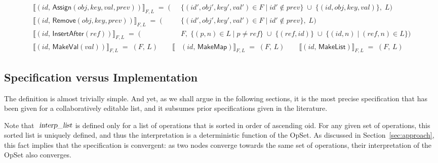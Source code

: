\begin{align*}
    \big\llbracket (\mathit{id},\, \mathsf{Assign}(\mathit{obj}, \mathit{key}, \mathit{val}, \mathit{prev})) \big\rrbracket_{F,L} \;=\; \Big( &
    \big\{ (\mathit{id}', \mathit{obj}', \mathit{key}', \mathit{val}') \in F \mid
    \mathit{id}' \notin \mathit{prev} \big\} \;\cup\;
    \big\{ (\mathit{id}, \mathit{obj}, \mathit{key}, \mathit{val}) \big\},\; L \Big) \\[5pt]
    \big\llbracket (\mathit{id},\, \mathsf{Remove}(\mathit{obj}, \mathit{key}, \mathit{prev})) \big\rrbracket_{F,L} \;=\; \Big( &
    \big\{ (\mathit{id}', \mathit{obj}', \mathit{key}', \mathit{val}') \in F \mid
    \mathit{id}' \notin \mathit{prev} \big\},\; L \Big) \\[5pt]
    \big\llbracket (\mathit{id},\, \mathsf{InsertAfter}(\mathit{ref})) \big\rrbracket_{F,L} \;=\; \Big( & F,\;
    \big\{ (p,n) \in L \mid p \neq \mathit{ref} \big\} \;\cup\;
    \big\{ (\mathit{ref}, \mathit{id}) \big\} \;\cup\;
    \big\{ (\mathit{id}, n) \mid (\mathit{ref}, n) \in L \big\} \Big) \\[10pt]
    \big\llbracket (\mathit{id},\, \mathsf{MakeVal}(\mathit{val})) \big\rrbracket_{F,L} \;=\; (F,\, L) \qquad
    \big\llbracket&(\mathit{id},\, \mathsf{MakeMap}) \big\rrbracket_{F,L} \;=\; (F,\, L) \qquad
    \big\llbracket (\mathit{id},\, \mathsf{MakeList}) \big\rrbracket_{F,L} \;=\; (F,\, L)
\end{align*}

\subsection{Specification versus Implementation}

The definition is almost trivially simple.
And yet, as we shall argue in the following sections, it is the most precise specification that has been given for a collaboratively editable list, and it subsumes prior specifications given in the literature.

Note that $\isa{interp{\isacharunderscore}list}$ is defined only for a list of operations that is sorted in order of ascending oid.
For any given set of operations, this sorted list is uniquely defined, and thus the interpretation is a deterministic function of the OpSet.
As discussed in Section~\ref{sec:approach}, this fact implies that the specification is convergent: as two nodes converge towards the same set of operations, their interpretation of the OpSet also converges.

